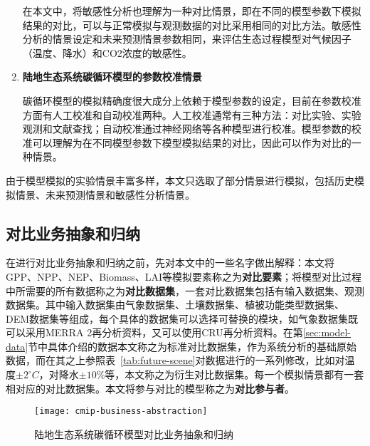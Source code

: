 \begin{enumerate}[(1)]
在本文中，将敏感性分析也理解为一种对比情景，即在不同的模型参数下模拟结果的对比，可以与正常模拟与观测数据的对比采用相同的对比方法。敏感性分析的情景设定和未来预测情景参数相同，来评估生态过程模型对气候因子（温度、降水）和CO2浓度的敏感性。

\item \textbf{陆地生态系统碳循环模型的参数校准情景}

碳循环模型的模拟精确度很大成分上依赖于模型参数的设定，目前在参数校准方面有人工校准和自动校准两种。人工校准通常有三种方法：对比实验、实验观测和文献查找；自动校准通过神经网络等各种模型进行校准。模型参数的校准可以理解为在不同模型参数下模型模拟结果的对比，因此可以作为对比的一种情景。

\end{enumerate}

由于模型模拟的实验情景丰富多样，本文只选取了部分情景进行模拟，包括历史模拟情景、未来预测情景和敏感性分析情景。

\subsection{对比业务抽象和归纳}

在进行对比业务抽象和归纳之前，先对本文中的一些名字做出解释：本文将GPP、NPP、NEP、Biomass、LAI等模拟要素称之为\textbf{对比要素}；将模型对比过程中所需要的所有数据称之为\textbf{对比数据集}，一套对比数据集包括有输入数据集、观测数据集。其中输入数据集由气象数据集、土壤数据集、植被功能类型数据集、DEM数据集等组成，每个具体的数据集可以选择可替换的模块，如气象数据集既可以采用MERRA 2再分析资料，又可以使用CRU再分析资料。在第\ref{sec:model-data}节中具体介绍的数据本文称之为标准对比数据集，作为系统分析的基础原始数据，而在其之上参照表~\ref{tab:future-scene}对数据进行的一系列修改，比如对温度$\pm2^{\circ}C$，对降水$\pm10\%$等，本文称之为衍生对比数据集。每一个模拟情景都有一套相对应的对比数据集。本文将参与对比的模型称之为\textbf{对比参与者}。

\begin{figure}[!htbp]
    \centering
    \texttt{[image: cmip-business-abstraction]}
    \caption{陆地生态系统碳循环模型对比业务抽象和归纳}
    \label{fig:cmip-business-abstraction}
\end{figure}

